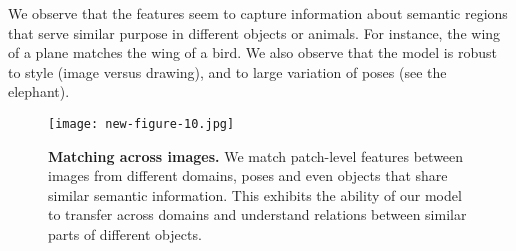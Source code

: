 We observe that the features seem to capture information about semantic regions that serve similar purpose in different objects or animals.
For instance, the wing of a plane matches the wing of a bird.
We also observe that the model is robust to style (image versus drawing), and to large variation of poses (see the elephant).

\begin{figure*}[t]
  \centering
  \texttt{[image: new-figure-10.jpg]}
  \caption{
    \textbf{Matching across images.} We match patch-level features between images from different domains, poses and even  objects that share similar semantic information. 
    This exhibits the ability of our model to transfer across domains and understand relations between similar parts of different objects.
  }
  \label{fig:matching}
 \end{figure*}
